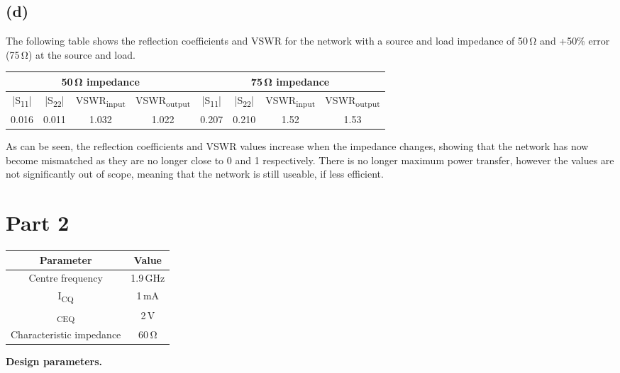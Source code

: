 \documentclass[12pt]{article}
\begin{document}
\subsection*{(d)}
The following table shows the reflection coefficients and VSWR for the network 
with a source and load impedance of 50\,\unit{\ohm} and +50\% error (75\,\unit{\ohm}) at the source and load.

\begin{center}
\begin{tabular}{|c | c | c | c || c | c | c | c|}
    \hline
    \multicolumn{4}{|c||}{50\,\unit{\ohm} impedance} & \multicolumn{4}{c|}{75\,\unit{\ohm} impedance} \\
    \hline
    |S\textsubscript{11}| & |S\textsubscript{22}| & VSWR\textsubscript{input} & VSWR\textsubscript{output} & |S\textsubscript{11}| & |S\textsubscript{22}| & VSWR\textsubscript{input} & VSWR\textsubscript{output} \\
    \hline
    0.016 & 0.011 & 1.032 & 1.022 & 0.207 & 0.210 & 1.52 & 1.53 \\
    \hline
\end{tabular}
\end{center}


As can be seen, the reflection coefficients and VSWR values increase when the impedance changes,
showing that the network has now become mismatched as they are no longer close to 0 and 1 respectively. 
There is no longer maximum power transfer, however the values are not significantly out of scope,
meaning that the network is still useable, if less efficient.

\section*{Part 2}
\begin{center}
\begin{tabular}{|c|c|}
\hline
\textbf{Parameter} & \textbf{Value} \\
\hline
Centre frequency & 1.9\,\unit{\giga\hertz} \\
I\textsubscript{CQ}& 1\,\unit{\milli\ampere} \\
\textsubscript{CEQ}& 2\,\unit{\volt} \\
Characteristic impedance& 60\,\unit{\ohm} \\
\hline
\end{tabular}

\textbf{Design parameters.}
\end{center}
\end{document}
